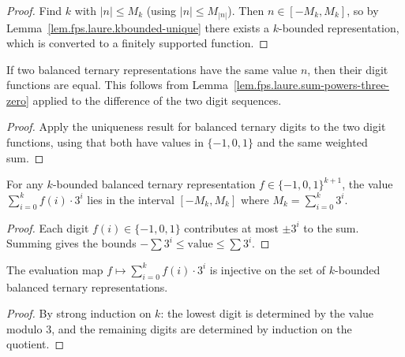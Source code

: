\begin{proof}
\leanok
Find $k$ with $|n| \le M_k$ (using $|n| \le M_{|n|}$).
Then $n \in [-M_k, M_k]$, so by Lemma~\ref{lem.fps.laure.kbounded-unique}
there exists a $k$-bounded representation, which is converted to a
finitely supported function.
\end{proof}

\begin{lemma}
\label{lem.fps.laure.bt-unique}
\leanhelper
\leanok
If two balanced ternary representations have the same value $n$,
then their digit functions are equal. This follows from
Lemma~\ref{lem.fps.laure.sum-powers-three-zero} applied to the
difference of the two digit sequences.
\end{lemma}

\begin{proof}
\leanok
Apply the uniqueness result for balanced ternary digits to the two digit functions,
using that both have values in $\{-1, 0, 1\}$ and the same weighted sum.
\end{proof}

\begin{lemma}
\label{lem.fps.laure.bt-value-mem-Icc}
\leanhelper
\leanok
For any $k$-bounded balanced ternary representation
$f \in \{-1, 0, 1\}^{k+1}$, the value
$\sum_{i=0}^{k} f(i) \cdot 3^i$ lies in the interval
$[-M_k, M_k]$ where $M_k = \sum_{i=0}^{k} 3^i$.
\end{lemma}

\begin{proof}
\leanok
Each digit $f(i) \in \{-1, 0, 1\}$ contributes at most $\pm 3^i$
to the sum. Summing gives the bounds
$-\sum 3^i \le \text{value} \le \sum 3^i$.
\end{proof}

\begin{lemma}
\label{lem.fps.laure.bt-injective}
\leanhelper
\leanok
The evaluation map $f \mapsto \sum_{i=0}^{k} f(i) \cdot 3^i$ is
injective on the set of $k$-bounded balanced ternary representations.
\end{lemma}

\begin{proof}
By strong induction on $k$: the lowest digit is determined by the value
modulo $3$, and the remaining digits are determined by induction on
the quotient.
\end{proof}

